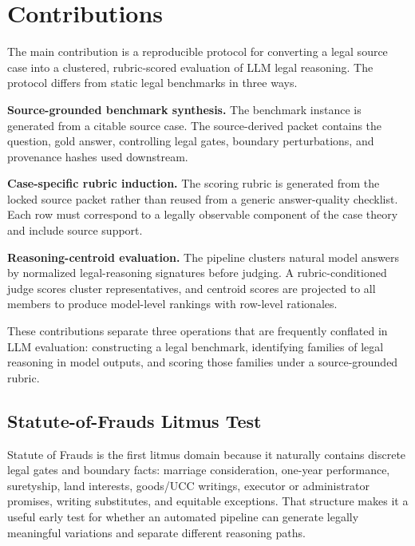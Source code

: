 \section{Contributions}

The main contribution is a reproducible protocol for converting a legal source
case into a clustered, rubric-scored evaluation of LLM legal reasoning. The
protocol differs from static legal benchmarks in three ways.

\textbf{Source-grounded benchmark synthesis.} The benchmark instance is
generated from a citable source case. The source-derived packet contains the
question, gold answer, controlling legal gates, boundary perturbations, and
provenance hashes used downstream.

\textbf{Case-specific rubric induction.} The scoring rubric is generated from
the locked source packet rather than reused from a generic answer-quality
checklist. Each row must correspond to a legally observable component of the
case theory and include source support.

\textbf{Reasoning-centroid evaluation.} The pipeline clusters natural model
answers by normalized legal-reasoning signatures before judging. A
rubric-conditioned judge scores cluster representatives, and centroid scores are
projected to all members to produce model-level rankings with row-level
rationales.

These contributions separate three operations that are frequently conflated in
LLM evaluation: constructing a legal benchmark, identifying families of legal
reasoning in model outputs, and scoring those families under a source-grounded
rubric.

\subsection{Statute-of-Frauds Litmus Test}

Statute of Frauds is the first litmus domain because it naturally contains
discrete legal gates and boundary facts: marriage consideration, one-year
performance, suretyship, land interests, goods/UCC writings, executor or
administrator promises, writing substitutes, and equitable exceptions. That
structure makes it a useful early test for whether an automated pipeline can
generate legally meaningful variations and separate different reasoning paths.

